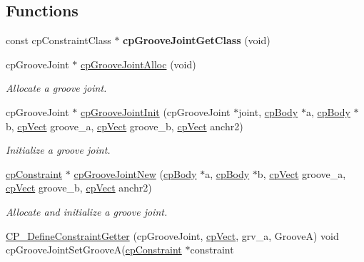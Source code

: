 \subsection*{Functions}
\begin{DoxyCompactItemize}
\item 
\hypertarget{group__cp_groove_joint_gaa0a41442d026472188094e3e47fa77cb}{const cp\-Constraint\-Class $\ast$ {\bfseries cp\-Groove\-Joint\-Get\-Class} (void)}\label{group__cp_groove_joint_gaa0a41442d026472188094e3e47fa77cb}

\item 
\hypertarget{group__cp_groove_joint_ga019749a30c1717dda8166c55ea99c0d0}{cp\-Groove\-Joint $\ast$ \hyperlink{group__cp_groove_joint_ga019749a30c1717dda8166c55ea99c0d0}{cp\-Groove\-Joint\-Alloc} (void)}\label{group__cp_groove_joint_ga019749a30c1717dda8166c55ea99c0d0}

\begin{DoxyCompactList}\small\item\em Allocate a groove joint. \end{DoxyCompactList}\item 
\hypertarget{group__cp_groove_joint_ga6a7be109a1d0aa14c2203e5d7b3e4118}{cp\-Groove\-Joint $\ast$ \hyperlink{group__cp_groove_joint_ga6a7be109a1d0aa14c2203e5d7b3e4118}{cp\-Groove\-Joint\-Init} (cp\-Groove\-Joint $\ast$joint, \hyperlink{structcp_body}{cp\-Body} $\ast$a, \hyperlink{structcp_body}{cp\-Body} $\ast$b, \hyperlink{structcp_vect}{cp\-Vect} groove\-\_\-a, \hyperlink{structcp_vect}{cp\-Vect} groove\-\_\-b, \hyperlink{structcp_vect}{cp\-Vect} anchr2)}\label{group__cp_groove_joint_ga6a7be109a1d0aa14c2203e5d7b3e4118}

\begin{DoxyCompactList}\small\item\em Initialize a groove joint. \end{DoxyCompactList}\item 
\hypertarget{group__cp_groove_joint_ga6a92f260d3ade2af1afad6848653dbb7}{\hyperlink{structcp_constraint}{cp\-Constraint} $\ast$ \hyperlink{group__cp_groove_joint_ga6a92f260d3ade2af1afad6848653dbb7}{cp\-Groove\-Joint\-New} (\hyperlink{structcp_body}{cp\-Body} $\ast$a, \hyperlink{structcp_body}{cp\-Body} $\ast$b, \hyperlink{structcp_vect}{cp\-Vect} groove\-\_\-a, \hyperlink{structcp_vect}{cp\-Vect} groove\-\_\-b, \hyperlink{structcp_vect}{cp\-Vect} anchr2)}\label{group__cp_groove_joint_ga6a92f260d3ade2af1afad6848653dbb7}

\begin{DoxyCompactList}\small\item\em Allocate and initialize a groove joint. \end{DoxyCompactList}\item 
\hypertarget{group__cp_groove_joint_ga96a5bc1fbb3f784255f782f2bcd8b5ce}{\hyperlink{group__cp_groove_joint_ga96a5bc1fbb3f784255f782f2bcd8b5ce}{C\-P\-\_\-\-Define\-Constraint\-Getter} (cp\-Groove\-Joint, \hyperlink{structcp_vect}{cp\-Vect}, grv\-\_\-a, Groove\-A) void cp\-Groove\-Joint\-Set\-Groove\-A(\hyperlink{structcp_constraint}{cp\-Constraint} $\ast$constraint}\label{group__cp_groove_joint_ga96a5bc1fbb3f784255f782f2bcd8b5ce}


\end{DoxyCompactItemize}
